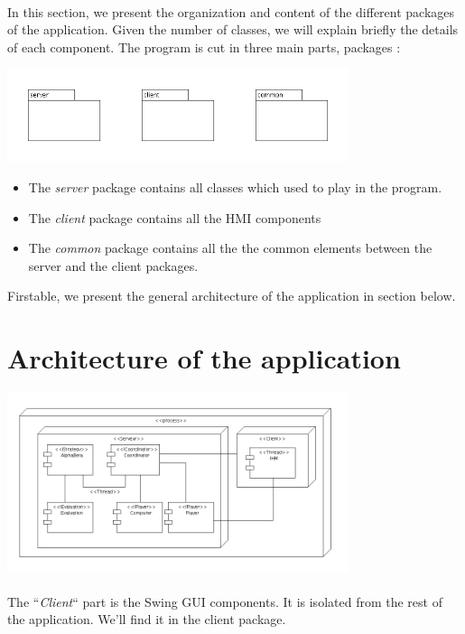 \documentclass[a4paper,12pt]{report}
\begin{document}
    \paragraph*{}
    In this section, we present the organization and content of the different packages of the application. 
    Given the number of classes, we will explain briefly the details of each component.
    The program is cut in three main parts, packages :

    \begin{center}
	\includegraphics[width=0.75\textwidth]{img_rapport/designing_1.png}
    \end{center}

    \begin{itemize}
	\item The \textit{server} package contains all classes which used to play in the program.
	\item The \textit{client} package contains all the HMI components
	\item The \textit{common} package contains all the the common elements between the server and the client packages.
    \end{itemize}
 
    Firstable, we present the general architecture of the application in section below.
    \section{Architecture of the application}
    \begin{center}
	\includegraphics[width=0.75\textwidth]{img_rapport/designing_0.png}
    \end{center}
    \paragraph*{}
    The ``\textit{Client}`` part is the Swing GUI components. It is isolated from the rest of the application. We'll find it in the client package.
    
\end{document}
